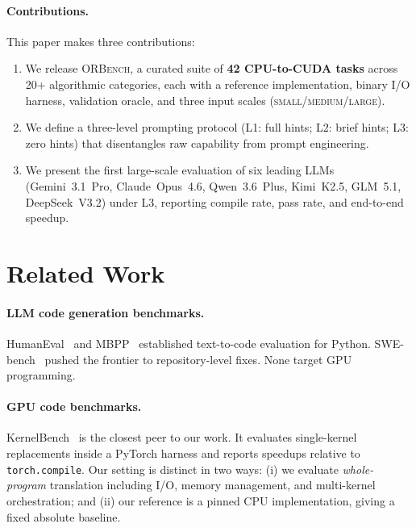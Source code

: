\documentclass{article}
\begin{document}
\paragraph{Contributions.} This paper makes three contributions:
\begin{enumerate}
  \item We release \textsc{ORBench}, a curated suite of
        \textbf{42 CPU-to-CUDA tasks} across 20+ algorithmic
        categories, each with a reference implementation, binary
        I/O harness, validation oracle, and three input scales
        (\textsc{small}/\textsc{medium}/\textsc{large}).
  \item We define a three-level prompting protocol (L1: full hints;
        L2: brief hints; L3: zero hints) that disentangles raw
        capability from prompt engineering.
  \item We present the first large-scale evaluation of six leading
        LLMs (Gemini~3.1~Pro, Claude~Opus~4.6, Qwen~3.6~Plus,
        Kimi~K2.5, GLM~5.1, DeepSeek~V3.2) under L3, reporting
        compile rate, pass rate, and end-to-end speedup.
\end{enumerate}

\section{Related Work}
\label{sec:related}

\paragraph{LLM code generation benchmarks.}
HumanEval~\citep{humaneval} and MBPP~\citep{mbpp} established
text-to-code evaluation for Python. SWE-bench~\citep{swebench} pushed
the frontier to repository-level fixes. None target GPU programming.

\paragraph{GPU code benchmarks.}
KernelBench~\citep{kernelbench} is the closest peer to our work. It
evaluates single-kernel replacements inside a PyTorch harness and
reports speedups relative to \texttt{torch.compile}. Our setting is
distinct in two ways: (i) we evaluate \emph{whole-program} translation
including I/O, memory management, and multi-kernel orchestration; and
(ii) our reference is a pinned CPU implementation, giving a fixed
absolute baseline.
\end{document}
